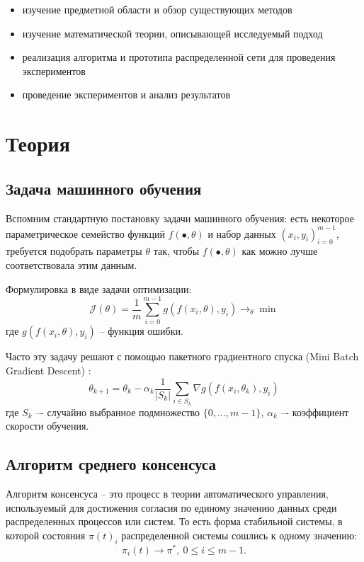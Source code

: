 \documentclass[a4paper,article,14pt]{extarticle}
\begin{document}
\begin{itemize}
  \item изучение предметной области и обзор существующих методов
  \item изучение математической теории, описывающей исследуемый подход
  \item реализация алгоритма и прототипа распределенной сети для проведения экспериментов
  \item проведение экспериментов и анализ результатов
\end{itemize}
\pagebreak

\section{Теория}
\subsection{Задача машинного обучения}
Вспомним стандартную постановку задачи машинного обучения: есть некоторое параметрическое семейство функций  $f(\bullet, \theta)$ и набор данных $(x_i, y_i)_{i=0}^{m-1}$, требуется подобрать параметры $\theta$ так, чтобы $f(\bullet, \theta)$ как можно лучше соответствовала этим данным.

Формулировка в виде задачи оптимизации:
 \begin{equation} \label{eq:ml_task}
 \mathcal{J}(\theta)=
 \frac{1}{m}\sum_{i=0}^{m-1}g(f(x_i, \theta), y_i)\rightarrow_{\theta}\min
 \end{equation}
где $g(f(x_i, \theta), y_i)$ -- функция ошибки.

Часто эту задачу решают с помощью пакетного градиентного спуска (Mini Batch Gradient Descent) \cite{mbgd}:
  \begin{equation} \label{eq:mbgd}
\theta_{k+1} = \theta_k - \alpha_k\frac{1}{|S_k|}\sum_{i\in S_k}\nabla g(f(x_i, \theta_k), y_i)
 \end{equation}
где $S_k$ –- случайно выбранное подмножество $\{0, \ldots, m-1\}$, $\alpha_k$ –- коэффициент скорости обучения.

\subsection{Алгоритм среднего консенсуса}

Алгоритм консенсуса -- это процесс в теории автоматического управления, используемый для достижения согласия по единому значению данных среди распределенных процессов или систем. То есть форма стабильной системы, в которой состояния $\pi(t)_i$ распределенной системы сошлись к одному значению:
\begin{equation}
\pi_i(t)\rightarrow \pi^*,~0\leq i\leq m-1.
\end{equation}
\end{document}
